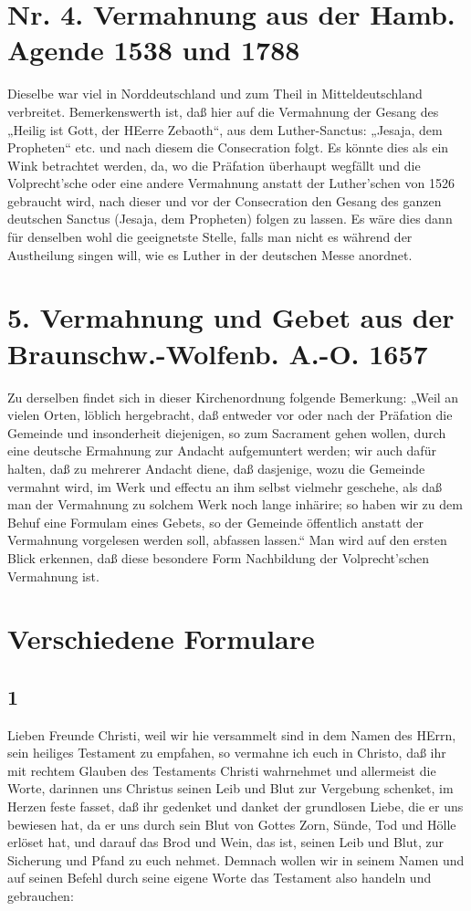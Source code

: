 \section[Nr. 4. Vermahnung aus der Hamb. Agende]{Nr. 4. Vermahnung aus der Hamb. Agende 1538 und 1788}
Dieselbe war viel in Norddeutschland und zum Theil in Mitteldeutschland verbreitet. Bemerkenswerth ist, daß hier auf die Vermahnung der Gesang des „Heilig ist Gott, der HEerre Zebaoth“, aus dem Luther-Sanctus: „Jesaja, dem Propheten“ etc. und nach diesem die Consecration folgt. Es könnte dies als ein Wink betrachtet werden, da, wo die Präfation überhaupt wegfällt und die Volprecht’sche oder eine andere Vermahnung anstatt der Luther’schen von 1526 gebraucht wird, nach dieser und vor der Consecration den Gesang des ganzen deutschen Sanctus (Jesaja, dem Propheten) folgen zu lassen. Es wäre dies dann für denselben wohl die geeignetste Stelle, falls man nicht es während der Austheilung singen will, wie es Luther in der deutschen Messe anordnet.

\section[5. Vermahnung und Gebet]{5. Vermahnung und Gebet aus der Braunschw.-Wolfenb. A.-O. 1657}
Zu derselben findet sich in dieser Kirchenordnung folgende Bemerkung: „Weil an vielen Orten, löblich hergebracht, daß entweder vor oder nach der Präfation die Gemeinde und insonderheit diejenigen, so zum Sacrament gehen wollen, durch eine deutsche Ermahnung zur Andacht aufgemuntert werden; wir auch dafür halten, daß zu mehrerer Andacht diene, daß dasjenige, wozu die Gemeinde vermahnt wird, im Werk und effectu an ihm selbst vielmehr geschehe, als daß man der Vermahnung zu solchem Werk noch lange inhärire; so haben wir zu dem Behuf eine Formulam eines Gebets, so der Gemeinde öffentlich anstatt der Vermahnung vorgelesen werden soll, abfassen lassen.“ Man wird auf den ersten Blick erkennen, daß diese besondere Form Nachbildung der Volprecht’schen Vermahnung ist.

\section{Verschiedene Formulare}
\subsection{1}
Lieben Freunde Christi, weil wir hie versammelt sind in dem Namen des HErrn, sein heiliges Testament zu empfahen, so vermahne ich euch in Christo, daß ihr mit rechtem Glauben des Testaments Christi wahrnehmet und allermeist die Worte, darinnen uns Christus seinen Leib und Blut zur Vergebung schenket, im Herzen feste fasset, daß ihr gedenket und danket der grundlosen Liebe, die er uns bewiesen hat, da er uns durch sein Blut von Gottes Zorn, Sünde, Tod und Hölle erlöset hat, und darauf das Brod und Wein, das ist, seinen Leib und Blut, zur Sicherung und Pfand zu euch nehmet. Demnach wollen wir in seinem Namen und auf seinen Befehl durch seine eigene Worte das Testament also handeln und gebrauchen:


